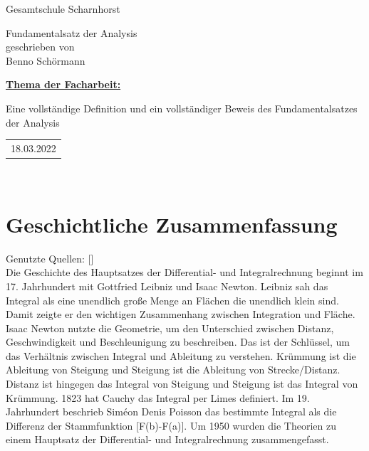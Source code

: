 \documentclass[fontsize=12pt,paper=a4,DIV12,cleardoublepage=empty, 
liststotoc,idxtotoc,bibtotoc]{article}
\theoremstyle{plain}
\theoremstyle{definition}
\begin{document}
	\begin{titlepage}
		\vspace*{-3cm}
		\noindent
		\hspace*{1cm}
			\begin{center}
				\centering
				{\LARGE Gesamtschule Scharnhorst}
			\end{center}
		\begin{center}
		\Large{Fundamentalsatz der Analysis}\\[0.5cm]
		\normalsize{geschrieben von}\\[0.25cm]	
		\large{Benno Schörmann}\\[0.5cm]
		\end{center}
	\begin{flushleft}
	\hyperref[subsec:thema1]{\textbf{\large Thema der Facharbeit:}}  \\
	\end{flushleft}
	Eine vollständige Definition und ein vollständiger Beweis des Fundamentalsatzes der Analysis
	\vfill
	\vfill
	\begin{tabular}{r}
	\Large{18.03.2022}\normalsize
	\end{tabular}
	\hfill
	\quad \\[1.5cm]
	\noindent 
	\renewcommand{\arraystretch}{1.4}
	\end{titlepage}
	\newpage
	\thispagestyle{empty}
	\tableofcontents
	\newpage
	
	
	
	\section{Geschichtliche Zusammenfassung}
	Genutzte Quellen: [\cite[vgl.]{DMB}]\\
	Die Geschichte des Hauptsatzes der Differential- und Integralrechnung beginnt im 17. Jahrhundert mit Gottfried Leibniz und Isaac Newton. Leibniz sah das Integral als eine unendlich große Menge an Flächen die unendlich klein sind. Damit zeigte er den wichtigen Zusammenhang zwischen Integration und Fläche. Isaac Newton nutzte die Geometrie, um den Unterschied zwischen Distanz, Geschwindigkeit und Beschleunigung zu beschreiben. Das ist der Schlüssel, um das Verhältnis zwischen Integral und Ableitung zu verstehen. Krümmung ist die Ableitung von Steigung und Steigung ist die Ableitung von Strecke/Distanz. Distanz ist hingegen das Integral von Steigung und Steigung ist das Integral von Krümmung. 1823 hat Cauchy das Integral per Limes definiert. Im 19. Jahrhundert beschrieb Siméon Denis Poisson das bestimmte Integral als die Differenz der Stammfunktion [F(b)-F(a)]. Um 1950 wurden die Theorien zu einem Hauptsatz der Differential- und Integralrechnung zusammengefasst.
\newpage
	
\end{document}
